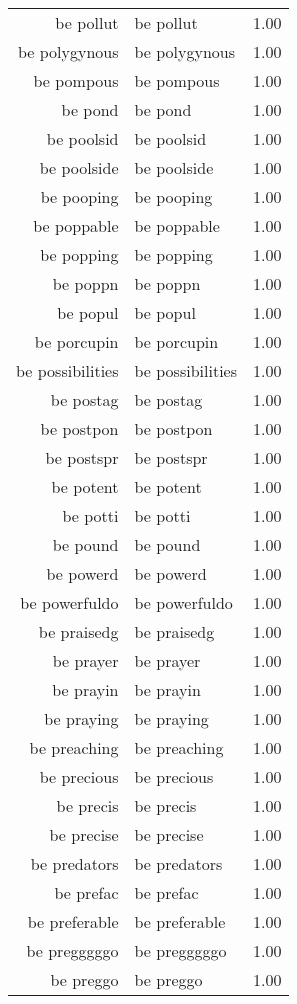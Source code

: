 \begin{table}[ht]
\begin{tabular}{rlr}
  be pollut & be pollut & 1.00 \\ 
  be polygynous & be polygynous & 1.00 \\ 
  be pompous & be pompous & 1.00 \\ 
  be pond & be pond & 1.00 \\ 
  be poolsid & be poolsid & 1.00 \\ 
  be poolside & be poolside & 1.00 \\ 
  be pooping & be pooping & 1.00 \\ 
  be poppable & be poppable & 1.00 \\ 
  be popping & be popping & 1.00 \\ 
  be poppn & be poppn & 1.00 \\ 
  be popul & be popul & 1.00 \\ 
  be porcupin & be porcupin & 1.00 \\ 
  be possibilities & be possibilities & 1.00 \\ 
  be postag & be postag & 1.00 \\ 
  be postpon & be postpon & 1.00 \\ 
  be postspr & be postspr & 1.00 \\ 
  be potent & be potent & 1.00 \\ 
  be potti & be potti & 1.00 \\ 
  be pound & be pound & 1.00 \\ 
  be powerd & be powerd & 1.00 \\ 
  be powerfuldo & be powerfuldo & 1.00 \\ 
  be praisedg & be praisedg & 1.00 \\ 
  be prayer & be prayer & 1.00 \\ 
  be prayin & be prayin & 1.00 \\ 
  be praying & be praying & 1.00 \\ 
  be preaching & be preaching & 1.00 \\ 
  be precious & be precious & 1.00 \\ 
  be precis & be precis & 1.00 \\ 
  be precise & be precise & 1.00 \\ 
  be predators & be predators & 1.00 \\ 
  be prefac & be prefac & 1.00 \\ 
  be preferable & be preferable & 1.00 \\ 
  be pregggggo & be pregggggo & 1.00 \\ 
  be preggo & be preggo & 1.00 \\ 

\end{tabular}
\end{table}
